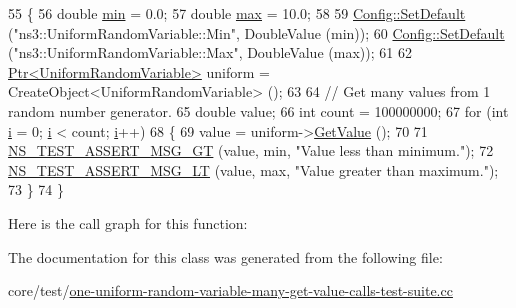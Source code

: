 \begin{DoxyCode}
55 \{
56   \textcolor{keywordtype}{double} \hyperlink{80211b_8c_ac6afabdc09a49a433ee19d8a9486056d}{min} = 0.0;
57   \textcolor{keywordtype}{double} \hyperlink{80211b_8c_affe776513b24d84b39af8ab0930fef7f}{max} = 10.0;
58 
59   \hyperlink{group__config_ga2e7882df849d8ba4aaad31c934c40c06}{Config::SetDefault} (\textcolor{stringliteral}{"ns3::UniformRandomVariable::Min"}, DoubleValue (min));
60   \hyperlink{group__config_ga2e7882df849d8ba4aaad31c934c40c06}{Config::SetDefault} (\textcolor{stringliteral}{"ns3::UniformRandomVariable::Max"}, DoubleValue (max));
61 
62   \hyperlink{classns3_1_1Ptr}{Ptr<UniformRandomVariable>} uniform = CreateObject<UniformRandomVariable> ();
63 
64   \textcolor{comment}{// Get many values from 1 random number generator.}
65   \textcolor{keywordtype}{double} value;
66   \textcolor{keywordtype}{int} count = 100000000;
67   \textcolor{keywordflow}{for} (\textcolor{keywordtype}{int} \hyperlink{bernuolliDistribution_8m_a6f6ccfcf58b31cb6412107d9d5281426}{i} = 0; \hyperlink{bernuolliDistribution_8m_a6f6ccfcf58b31cb6412107d9d5281426}{i} < count; \hyperlink{bernuolliDistribution_8m_a6f6ccfcf58b31cb6412107d9d5281426}{i}++)
68     \{
69       value = uniform->\hyperlink{classns3_1_1UniformRandomVariable_a03822d8c86ac51e9aa83bbc73041386b}{GetValue} ();
70 
71       \hyperlink{group__testing_ga868cfb773df312b867a506bdd2e3cbef}{NS\_TEST\_ASSERT\_MSG\_GT} (value, min, \textcolor{stringliteral}{"Value less than minimum."});
72       \hyperlink{group__testing_ga1d96848b91407c9a0b36583e8b0ad7ae}{NS\_TEST\_ASSERT\_MSG\_LT} (value, max, \textcolor{stringliteral}{"Value greater than maximum."});
73     \}
74 \}
\end{DoxyCode}


Here is the call graph for this function\+:




The documentation for this class was generated from the following file\+:\begin{DoxyCompactItemize}
\item 
core/test/\hyperlink{one-uniform-random-variable-many-get-value-calls-test-suite_8cc}{one-\/uniform-\/random-\/variable-\/many-\/get-\/value-\/calls-\/test-\/suite.\+cc}\end{DoxyCompactItemize}

